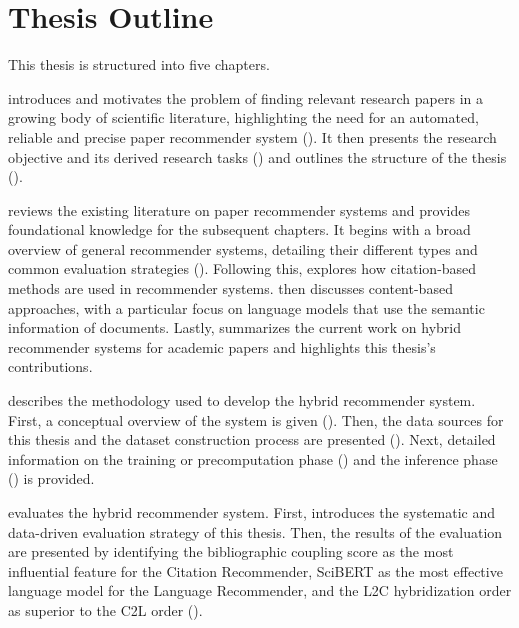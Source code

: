 \section{Thesis Outline} \label{sec:thesis-outline}

This thesis is structured into five chapters.

 introduces and motivates the problem of finding relevant research papers in a growing body of scientific literature, highlighting the need for an automated, reliable and precise paper recommender system (). It then presents the research objective and its derived research tasks () and outlines the structure of the thesis ().

 reviews the existing literature on paper recommender systems and provides foundational knowledge for the subsequent chapters. It begins with a broad overview of general recommender systems, detailing their different types and common evaluation strategies (). Following this,  explores how citation-based methods are used in recommender systems.  then discusses content-based approaches, with a particular focus on language models that use the semantic information of documents. Lastly,  summarizes the current work on hybrid recommender systems for academic papers and highlights this thesis's contributions.

 describes the methodology used to develop the hybrid recommender system. First, a conceptual overview of the system is given (). Then, the data sources for this thesis and the dataset construction process are presented (). Next, detailed information on the training or precomputation phase () and the inference phase () is provided.

 evaluates the hybrid recommender system. First,  introduces the systematic and data-driven evaluation strategy of this thesis.
Then, the results of the evaluation are presented by identifying the bibliographic coupling score as the most influential feature for the Citation Recommender, SciBERT as the most effective language model for the Language Recommender, and the \ac{L2C} hybridization order as superior to the \ac{C2L} order ().

